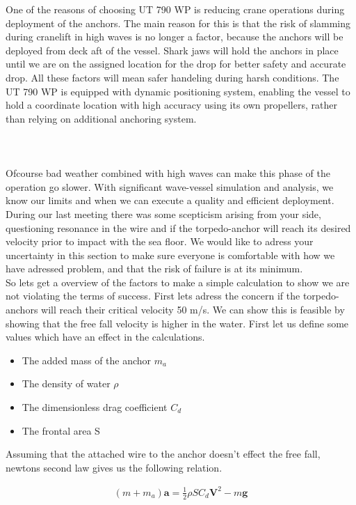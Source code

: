 \documentclass[a4paper,norsk]{article}
\begin{document}
 One of the reasons of choosing UT 790 WP is reducing crane operations during deployment of the anchors. The main reason for this is that the risk of slamming during cranelift in high waves is no longer a factor, because the anchors will be deployed from deck aft of the vessel.   Shark jaws will hold the anchors in place until we are on the assigned location for the drop for better safety and accurate drop. All these factors will mean safer handeling during harsh conditions. The UT 790 WP is equipped with dynamic positioning system, enabling the vessel to hold a coordinate location with high accuracy using its own propellers, rather than relying on additional anchoring system.
\\ \\ \\ \\ 
Ofcourse bad weather combined with high waves can make this phase of the operation go slower. With significant wave-vessel simulation and analysis, we know our limits and when we can execute a quality and efficient deployment.  
\\
During our last meeting there was some scepticism arising from your side, questioning resonance in the wire and if the torpedo-anchor will reach its desired velocity prior to impact with the sea floor. We would like to adress your uncertainty in this section to make sure everyone is comfortable with how we have adressed problem, and that the risk of failure is at its minimum. 
\\
So lets get a overview of the factors to make a simple calculation to show we are not violating the terms of success. First lets adress the concern if the torpedo-anchors will reach their critical velocity 50 m/s. We can show this is feasible by showing that the free fall velocity is higher in the water. First let us define some values which have an effect in the calculations.
\begin{itemize}
\item The added mass of the anchor $m_a$ 
\item The density of water $\rho$
\item The dimensionless drag coefficient $C_d$
\item The frontal area S
\end{itemize}

 Assuming that the attached wire to the anchor doesn't effect the free fall, newtons second law gives us the following relation.

\begin{align}
(m+m_a)\textbf{a} = \frac{1}{2}\rho SC_d \textbf{V}^2 - m\textbf{g}
\end{align}
\end{document}
